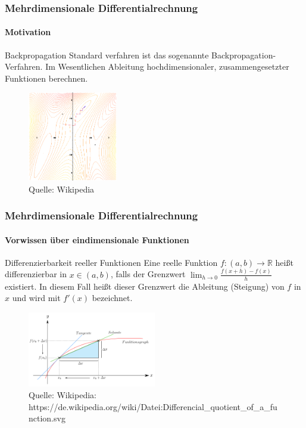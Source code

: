 \documentclass{beamer}
\begin{document}
\begin{frame}
    \frametitle{Mehrdimensionale Differentialrechnung}
\framesubtitle{Motivation}
    \begin{block}{Backpropagation}
Standard verfahren ist das sogenannte Backpropagation-Verfahren.
Im Wesentlichen Ableitung hochdimensionaler, zusammengesetzter Funktionen berechnen.
\end{block}

\begin{figure}[htp]
    \includegraphics[width=0.35\textwidth]{images/Gradient_ascent}
      \caption{Quelle: Wikipedia}
\end{figure}
 \end{frame}


\begin{frame}
    \frametitle{Mehrdimensionale Differentialrechnung}
\framesubtitle{Vorwissen über eindimensionale  Funktionen}
    \begin{block}{Differenzierbarkeit reeller Funktionen}
Eine reelle Funktion $f : (a, b) \to \mathbb{R}$  heißt differenzierbar in $x \in (a,b)$, falls der Grenzwert $\lim_{h \to 0}  \frac{f(x +h) - f(x)}  {h}$ existiert. In diesem Fall heißt dieser Grenzwert die Ableitung (Steigung) von $f$ in $x$ und wird mit $f' (x)$ bezeichnet.
\end{block}
\begin{figure}[H]
      \centering
    \includegraphics[width=0.5\textwidth]{images/Differencial_quotient_of_a_function}
      \caption{Quelle: Wikipedia: https://de.wikipedia.org/wiki/Datei:Differencial\_quotient\_of\_a\_function.svg}
\end{figure}
 \end{frame}
\end{document}
